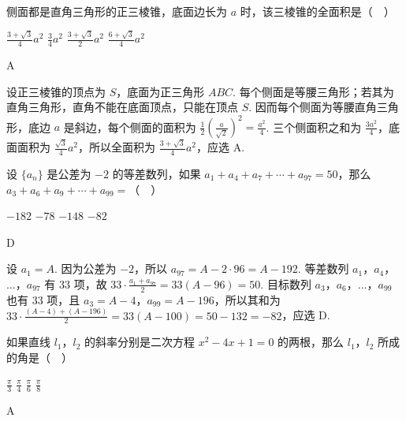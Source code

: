 \documentclass[UTF8,a4paper,oneside,11pt]{ctexbook}
\begin{document}
\begin{problem}
侧面都是直角三角形的正三棱锥，底面边长为 \(a\) 时，该三棱锥的全面积是（\(\quad\)）

\choices
    {\(\frac{3+\sqrt{3}}{4}a^2\)}
    {\(\frac{3}{4}a^2\)}
    {\(\frac{3+\sqrt{3}}{2}a^2\)}
    {\(\frac{6+\sqrt{3}}{4}a^2\)}
\end{problem}

\begin{answer}
A
\end{answer}

\begin{solution}
设正三棱锥的顶点为 \(S\)，底面为正三角形 \(ABC\). 每个侧面是等腰三角形；若其为直角三角形，直角不能在底面顶点，只能在顶点 \(S\). 因而每个侧面为等腰直角三角形，底边 \(a\) 是斜边，每个侧面的面积为 \(\frac12\left(\frac{a}{\sqrt2}\right)^2=\frac{a^2}{4}\). 三个侧面积之和为 \(\frac{3a^2}{4}\)，底面面积为 \(\frac{\sqrt3}{4}a^2\)，所以全面积为 \(\frac{3+\sqrt3}{4}a^2\)，应选 A.
\end{solution}

\begin{problem}
设 \(\{a_n\}\) 是公差为 \(-2\) 的等差数列，如果 \(a_1+a_4+a_7+\cdots+a_{97}=50\)，那么 \(a_3+a_6+a_9+\cdots+a_{99}=\)（\(\quad\)）

\choices
    {\(-182\)}
    {\(-78\)}
    {\(-148\)}
    {\(-82\)}
\end{problem}

\begin{answer}
D
\end{answer}

\begin{solution}
设 \(a_1=A\). 因为公差为 \(-2\)，所以
\(a_{97}=A-2\cdot96=A-192\). 等差数列 \(a_1\)，\(a_4\)，\(\ldots\)，\(a_{97}\) 有 \(33\) 项，故
\(33\cdot\frac{a_1+a_{97}}2=33(A-96)=50\).
目标数列 \(a_3\)，\(a_6\)，\(\ldots\)，\(a_{99}\) 也有 \(33\) 项，且 \(a_3=A-4\)，\(a_{99}=A-196\)，所以其和为
\(33\cdot\frac{(A-4)+(A-196)}2=33(A-100)=50-132=-82\)，应选 D.
\end{solution}

\begin{problem}
如果直线 \(l_1\)，\(l_2\) 的斜率分别是二次方程 \(x^2-4x+1=0\) 的两根，那么 \(l_1\)，\(l_2\) 所成的角是（\(\quad\)）

\choices
    {\(\frac{\pi}{3}\)}
    {\(\frac{\pi}{4}\)}
    {\(\frac{\pi}{6}\)}
    {\(\frac{\pi}{8}\)}
\end{problem}

\begin{answer}
A
\end{answer}
\end{document}
